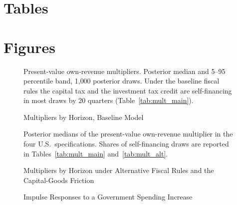 
\clearpage
\section*{Tables}


\newpage


\newpage


\newpage





\clearpage

\section*{Figures}

\begin{figure}[ht]
\centering
{}
\caption{Multipliers by Horizon, Baseline Model}
\label{fig:mult_main}
\par\footnotesize Present-value own-revenue multipliers. Posterior median and 5--95 percentile band, 1{,}000 posterior draws. Under the baseline fiscal rules the capital tax and the investment tax credit are self-financing in most draws by 20 quarters (Table~\ref{tab:mult_main}).
\end{figure}
\newpage

\begin{figure}[ht]
\centering
{}
\caption{Multipliers by Horizon under Alternative Fiscal Rules and the Capital-Goods Friction}
\label{fig:mult_models}
\par\footnotesize Posterior medians of the present-value own-revenue multiplier in the four U.S.\ specifications. Shares of self-financing draws are reported in Tables~\ref{tab:mult_main} and~\ref{tab:mult_alt}.
\end{figure}
\newpage

\begin{figure}[ht]
\centering
{}
\caption{Impulse Responses to a Government Spending Increase}
\label{fig:irf_g}
\end{figure}
\newpage

